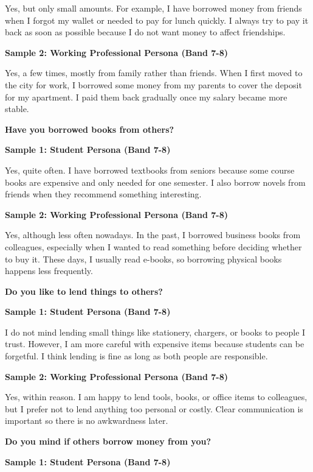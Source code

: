 Yes, but only small amounts. For example, I have borrowed money from friends when I forgot my wallet or needed to pay for lunch quickly. I always try to pay it back as soon as possible because I do not want money to affect friendships.

\textbf{Sample 2: Working Professional Persona (Band 7-8)}

Yes, a few times, mostly from family rather than friends. When I first moved to the city for work, I borrowed some money from my parents to cover the deposit for my apartment. I paid them back gradually once my salary became more stable.

\separator

\begin{ieltsquestion}
\textbf{Have you borrowed books from others?}
\end{ieltsquestion}
\textbf{Sample 1: Student Persona (Band 7-8)}

Yes, quite often. I have borrowed textbooks from seniors because some course books are expensive and only needed for one semester. I also borrow novels from friends when they recommend something interesting.

\textbf{Sample 2: Working Professional Persona (Band 7-8)}

Yes, although less often nowadays. In the past, I borrowed business books from colleagues, especially when I wanted to read something before deciding whether to buy it. These days, I usually read e-books, so borrowing physical books happens less frequently.

\separator

\begin{ieltsquestion}
\textbf{Do you like to lend things to others?}
\end{ieltsquestion}
\textbf{Sample 1: Student Persona (Band 7-8)}

I do not mind lending small things like stationery, chargers, or books to people I trust. However, I am more careful with expensive items because students can be forgetful. I think lending is fine as long as both people are responsible.

\textbf{Sample 2: Working Professional Persona (Band 7-8)}

Yes, within reason. I am happy to lend tools, books, or office items to colleagues, but I prefer not to lend anything too personal or costly. Clear communication is important so there is no awkwardness later.

\separator

\begin{ieltsquestion}
\textbf{Do you mind if others borrow money from you?}
\end{ieltsquestion}
\textbf{Sample 1: Student Persona (Band 7-8)}

